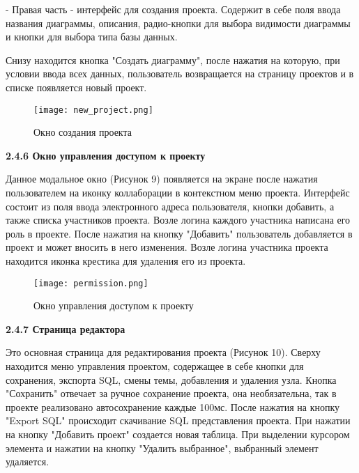     - Правая часть - интерфейс для создания проекта. Содержит в себе поля ввода названия диаграммы, описания, радио-кнопки для выбора видимости диаграммы и кнопки для выбора типа базы данных.
    
Снизу находится кнопка "Создать диаграмму", после нажатия на которую, при условии ввода всех данных, пользователь возвращается на страницу проектов и в списке появляется новый проект.

\renewcommand{\figurename}{Рисунок}
\begin{figure}[htbp]
    \centering %
    \texttt{[image: new\_project.png]}
    \caption{Окно создания проекта}
    \label{fig:analyze} %
\end{figure}

\newpage

\textbf{2.4.6 Окно управления доступом к проекту}

Данное модальное окно (Рисунок 9) появляется на экране после нажатия пользователем на иконку коллаборации в контекстном меню проекта. Интерфейс состоит из поля ввода электронного адреса пользователя, кнопки добавить, а также списка участников проекта. Возле логина каждого участника написана его роль в проекте. После нажатия на кнопку "Добавить" пользователь добавляется в проект и может вносить в него изменения. Возле логина участника проекта находится иконка крестика для удаления его из проекта.
    
\renewcommand{\figurename}{Рисунок}
\begin{figure}[htbp]
    \centering %
    \texttt{[image: permission.png]}
    \caption{Окно управления доступом к проекту}
    \label{fig:analyze} %
\end{figure}

\newpage

\textbf{2.4.7 Страница редактора}

Это основная страница для редактирования проекта (Рисунок 10). Сверху находится меню управления проектом, содержащее в себе кнопки для сохранения, экспорта SQL, смены темы, добавления и удаления узла. Кнопка "Сохранить" отвечает за ручное сохранение проекта, она необязательна, так в проекте реализовано автосохранение каждые 100мс. После нажатия на кнопку "Export SQL" происходит скачивание SQL представления проекта. При нажатии на кнопку "Добавить проект" создается новая таблица. При выделении курсором элемента и нажатии на кнопку "Удалить выбранное", выбранный элемент удаляется.

